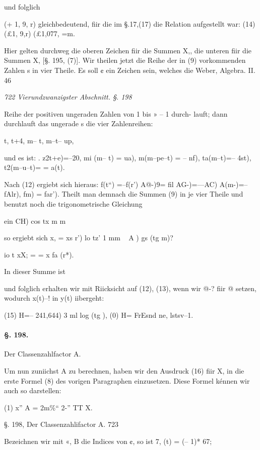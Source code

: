 \documentclass[12pt,a4paper]{article}
\theoremstyle{plain}
\theoremstyle{definition}
\begin{document}
und folglich

(+ 1, 9, r) gleichbedeutend, fiir die im §.17,(17) die Relation aufgestellt war: (14) (£1, 9,r) (£1,077, =m.

Hier gelten durchweg die oberen Zeichen fiir die Summen X,, die unteren fiir die Summen X, [§. 195, (7)]. Wir theilen jetzt die Reihe der in (9) vorkommenden Zahlen s in vier Theile. Es soll ¢ ein Zeichen sein, welches die Weber, Algebra. II. 46

\vspace{0.5\baselineskip}\noindent\textit{722 Vierundzwanzigster Abschnitt. §. 198}\par

Reihe der positiven ungeraden Zahlen von 1 bis » -- 1 durch- lauft; dann durchlauft das ungerade s die vier Zahlenreihen:

t, t+4, m-- t, m--t-- up,

und es ist: . z2t+e)=--20, mi (m-- t) = ua), m(m--pe--t) = -- nf), ta(m--t)=-- 4st), t2(m--u--t)= = a(t).

Nach (12) ergiebt sich hieraus: f(t``) =--f(r') A@-)9= fil AG\texttrademark *-)=---AC) A(m-)=--fAlr), fm) = far'). Theilt man demnach die Summen (9) in je vier Theile und benutzt noch die trigonometrische Gleichung

ein CH) cos tx m m

so ergiebt sich x, = xs r') lo tz' 1 mm ~ A ) gs (tg m)?

io t xX; = = x fa (r*).

In dieser Summe ist

und folglich erhalten wir mit Riicksicht auf (12), (13), wenn wir @-? fiir @ setzen, wodurch x(t)--! in y(t) iibergeht:

(15) H=-- 241,644) 3 ml log (tg ), (0) H= FrEsnd ne, lstsv--1.

\paragraph{§. 198.}

Der Classenzahlfactor A.

Um nun zuniichst A zu berechnen, haben wir den Ausdruck (16) fiir X, in die erste Formel (8) des vorigen Paragraphen einzusetzen. Diese Formel kénnen wir auch so darstellen:

(1) x'' A = 2m\%`` 2-'' TT X.

§. 198, Der Classenzahlifactor A. 723

Bezeichnen wir mit «, B die Indices von ¢, so ist 7, (t) = (-- 1)* 67;
\end{document}
